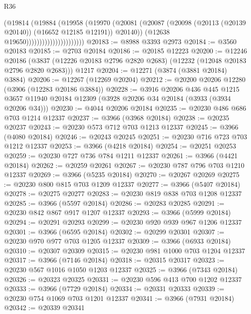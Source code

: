 \begin{lexlean}{R36}
\begin{coremodule}
                                      (@19814
                                        (@19884
                                          (@19958
                                            (@19970
                                              (@20081
                                                (@20087
                                                  (@20098
                                                    (@20113 (@20139 @20140))
                                                    (@16652 @12185 @12191))
                                                  @20140))
                                              (@12638 @19650))))))))))))))))))))))
@20183 := @8988 @3393 @2973
@20184 := @3560 @20183
@20185 := @2703 @20184
@20186 := @20185 @12223
@20200 := @12246
    @20186
    (@3837 (@12226 @20183 @2796 @2820 @2683) (@12232 (@12048 @20183 @2796 @2820 @2683)))
    @1217
@20204 := @12271 (@3874 (@3881 @20184) @3884)
@20206 := @12267 (@12269 @20204)
@20212 := @20200 @20206 @12280 (@3906 (@12283 @20186 @3884))
@20228 := @3916
    @20206
    @436
    @445
    @1215
    @3657
    @11940
    @20184
    @12309
    (@3928 @20206 @34 @20184 (@3933 (@3934 @20206 @34)))
@20230 := @4044 @20206 @20184
@20235 := @20230 @486 @686 @703 @1214 @12337
@20237 := @3966 (@3968 @20184)
@20238 := @20235 @20237
@20243 := @20230 @573 @712 @703 @1213 @12337
@20245 := @3966 (@4080 @20184)
@20246 := @20243 @20245
@20251 := @20230 @716 @723 @703 @1212 @12337
@20253 := @3966 (@4218 @20184)
@20254 := @20251 @20253
@20259 := @20230 @727 @736 @784 @1211 @12337
@20261 := @3966 (@4421 @20184)
@20262 := @20259 @20261
@20267 := @20230 @787 @796 @703 @1210 @12337
@20269 := @3966 (@5235 @20184)
@20270 := @20267 @20269
@20275 := @20230 @800 @815 @703 @1209 @12337
@20277 := @3966 (@5407 @20184)
@20278 := @20275 @20277
@20283 := @20230 @819 @838 @703 @1208 @12337
@20285 := @3966 (@5597 @20184)
@20286 := @20283 @20285
@20291 := @20230 @842 @867 @917 @1207 @12337
@20293 := @3966 (@5999 @20184)
@20294 := @20291 @20293
@20299 := @20230 @920 @939 @967 @1206 @12337
@20301 := @3966 (@6595 @20184)
@20302 := @20299 @20301
@20307 := @20230 @970 @977 @703 @1205 @12337
@20309 := @3966 (@6933 @20184)
@20310 := @20307 @20309
@20315 := @20230 @981 @1000 @703 @1204 @12337
@20317 := @3966 (@7146 @20184)
@20318 := @20315 @20317
@20323 := @20230 @567 @1016 @1050 @1203 @12337
@20325 := @3966 (@7343 @20184)
@20326 := @20323 @20325
@20331 := @20230 @596 @413 @700 @1202 @12337
@20333 := @3966 (@7729 @20184)
@20334 := @20331 @20333
@20339 := @20230 @754 @1069 @703 @1201 @12337
@20341 := @3966 (@7931 @20184)
@20342 := @20339 @20341

\end{coremodule}
\end{lexlean}
